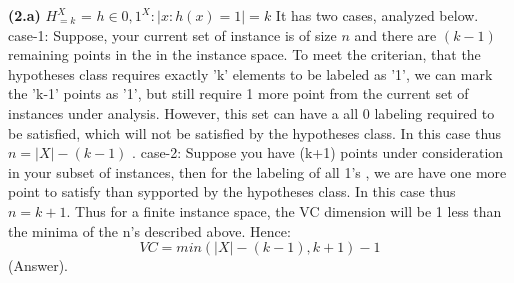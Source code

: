 \documentclass{article}
\renewcommand\part[1]{\vspace{.10in}\textbf{(#1)}}
\begin{document}
  \part{2.a} 
    $H_{=k}^X$ = ${h \in {0,1}^X : |{x:h(x)=1}| = k}$ \newline
    It has two cases, analyzed below. \newline
    case-1: Suppose, your current set of instance is of size $n$ and there are $(k-1)$ remaining points in the in the instance space. To meet the criterian, that the hypotheses class requires exactly 'k' elements to be labeled as '1', we can mark the 'k-1' points as '1', but still require 1 more point from the current set of instances under analysis. However, this set can have a all 0 labeling required to be satisfied, which will not be satisfied by the hypotheses class. In this case thus $n = |X| - (k-1)$ . \newline
    case-2: Suppose you have (k+1) points under consideration in your subset of instances, then for the labeling of all 1's , we are have one more point to satisfy than sypported by the hypotheses class. In this case thus $n = k+1$. \newline
    Thus for a finite instance space, the VC dimension will be 1 less than the minima of the n's described above. Hence: \newline
    \[ VC = min(|X| - (k-1) , k+1) - 1\]
    (Answer).


    
\end{document}
